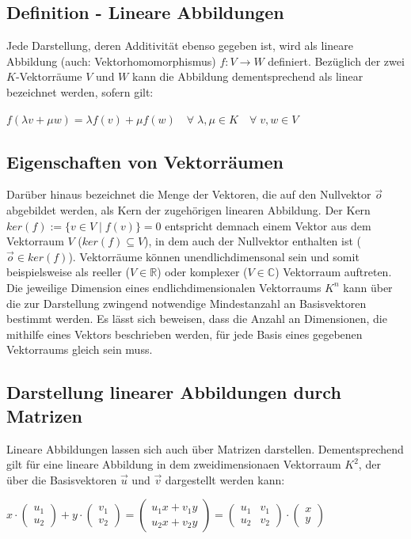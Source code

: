 \documentclass[]{dsadokumentation}
\begin{document}
\subsection{Definition - Lineare Abbildungen}
Jede Darstellung, deren Additivität ebenso gegeben ist, wird als lineare Abbildung (auch: Vektorhomomorphismus) $f: V \rightarrow W$ definiert. Bezüglich der zwei $K$-Vektorräume $V$ und $W$ kann die Abbildung dementsprechend als linear bezeichnet werden, sofern gilt:
\begin{center} $f(\lambda v + \mu w)=\lambda f(v) + \mu f(w) \quad \forall \; \lambda, \mu \in K \quad \forall \; v, w \in V$ \end{center}

\subsection{Eigenschaften von Vektorräumen}
Darüber hinaus bezeichnet die Menge der Vektoren, die auf den Nullvektor $\vec{o}$ abgebildet werden, als Kern der zugehörigen linearen Abbildung. Der Kern $ker(f):= \{v \in V \; \big\vert \; f(v) \} = 0$ entspricht demnach einem Vektor aus dem Vektorraum $V$ ($ker(f) \subseteq V$), in dem auch der Nullvektor enthalten ist ($\vec{o} \in ker(f)$). Vektorräume können unendlichdimensonal sein und somit beispielsweise als reeller ($V \in \mathbb{R}$) oder komplexer ($V \in \mathbb{C}$) Vektorraum auftreten. Die jeweilige Dimension eines endlichdimensionalen Vektorraums $K^n$ kann über die zur Darstellung zwingend notwendige Mindestanzahl an Basisvektoren bestimmt werden. Es lässt sich beweisen, dass die Anzahl an Dimensionen, die mithilfe eines Vektors beschrieben werden, für jede Basis eines gegebenen Vektorraums gleich sein muss.

\subsection{Darstellung linearer Abbildungen durch Matrizen}
Lineare Abbildungen lassen sich auch über Matrizen darstellen. Dementsprechend gilt für eine lineare Abbildung in dem zweidimensionaen Vektorraum $K^2$, der über die Basisvektoren $\vec{u}$ und $\vec{v}$ dargestellt werden kann:
\begin{center} $x \cdot \left(\begin{array}{c} u_1 \\ u_2 \end{array}\right) + y \cdot \left(\begin{array}{c} v_1 \\ v_2 \end{array}\right) = \left(\begin{array}{c} u_1 x + v_1 y \\ u_2 x + v_2 y \end{array}\right) = \left( \begin{array}{rr} u_1 & v_1 \\ u_2 & v_2 \end{array}\right) \cdot \left(\begin{array}{c} x \\ y \end{array}\right)$ \end{center}
\end{document}

